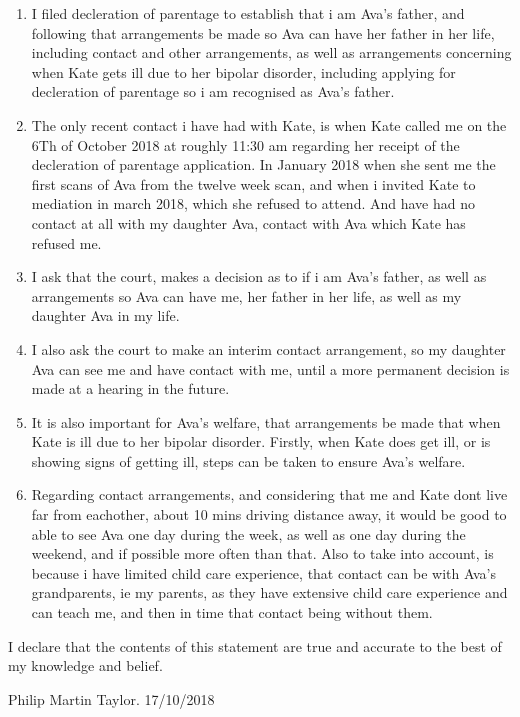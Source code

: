 \documentclass[10pt,a4paper]{book}
\begin{document}
\begin{enumerate}
  \item I filed decleration of parentage to establish that i am Ava's father, and following that arrangements be made so Ava can have her father in her life, including contact and other arrangements, as well as arrangements concerning when Kate gets ill due to her bipolar disorder, including applying for decleration of parentage so i am recognised as Ava's father.
  \item The only recent contact i have had with Kate, is when Kate called me on the 6Th of October 2018 at roughly 11:30 am regarding her receipt of the decleration of parentage application. In January 2018 when she sent me the first scans of Ava from the twelve week scan, and when i invited Kate to mediation in march 2018, which she refused to attend. And have had no contact at all with my daughter Ava, contact with Ava which Kate has refused me.
  \item I ask that the court, makes a decision as to if i am Ava's father, as well as arrangements so Ava can have me, her father in her life, as well as my daughter Ava in my life.
  \item I also ask the court to make an interim contact arrangement, so my daughter Ava can see me and have contact with me, until a more permanent decision is made at a hearing in the future.
  \item It is also important for Ava's welfare, that arrangements be made that when Kate is ill due to her bipolar disorder. Firstly, when Kate does get ill, or is showing signs of getting ill, steps can be taken to ensure Ava's welfare.
    \item Regarding contact arrangements, and considering that me and Kate dont live far from eachother, about 10 mins driving distance away, it would be good to able to see Ava one day during the week, as well as one day during the weekend, and if possible more often than that. Also to take into account, is because i have limited child care experience, that contact can be with Ava's grandparents, ie my parents, as they have extensive child care experience and can teach me, and then in time that contact being without them. 
    \end{enumerate}
    \begin{flushleft}
      I declare that the contents of this statement are true and accurate to the best of my knowledge and belief.
\end{flushleft}
\begin{center}
  Philip Martin Taylor. 17/10/2018
\end{center}
\end{document}
